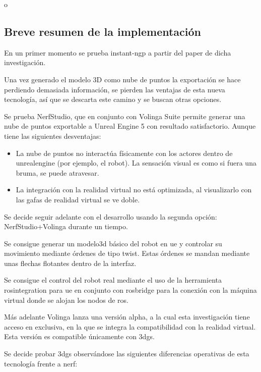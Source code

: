 \documentclass[a4paper, 12pt, spanish, twoside]{article}
\begin{document}
o

\subsection{Breve resumen de la implementación} 

En un primer momento se prueba \gls{instant-ngp} a partir del paper de dicha investigación. 

Una vez generado el modelo 3D como nube de puntos la exportación se hace perdiendo demasiada información, se pierden las ventajas de esta nueva tecnología, así que se descarta este camino y se buscan otras opciones. 

Se prueba NerfStudio, que en conjunto con Volinga Suite permite generar una nube de puntos exportable a Unreal Engine 5 con resultado satisfactorio. Aunque tiene las siguientes desventajas: 

\begin{itemize} 
\item La nube de puntos no interactúa físicamente con los \gls{actores} dentro de \gls{unrealengine} (por ejemplo, el robot). La sensación visual es como si fuera una bruma, se puede atravesar. 

\item La integración con la realidad virtual no está optimizada, al visualizarlo con las gafas de realidad virtual se ve doble. 
\end{itemize} 

Se decide seguir adelante con el desarrollo usando la segunda opción: NerfStudio+Volinga durante un tiempo. 

Se consigue generar un \gls{modelo3d} básico del robot en \acrshort{ue} y controlar su movimiento mediante órdenes de tipo \gls{twist}. Estas órdenes se mandan mediante unas flechas flotantes dentro de la interfaz. 

Se consigue el control del robot real mediante el uso de la herramienta \gls{rosintegration} para \acrshort{ue} en conjunto con \gls{rosbridge} para la conexión con la máquina virtual donde se alojan los nodos de \acrshort{ros}. 

Más adelante Volinga lanza una versión alpha, a la cual esta investigación tiene acceso en exclusiva, en la que se integra la compatibilidad con la realidad virtual. Esta versión es compatible únicamente con \acrshort{3dgs}. 

Se decide probar \acrshort{3dgs} observándose las siguientes diferencias operativas de esta tecnología frente a \acrshort{nerf}: 
\end{document}
